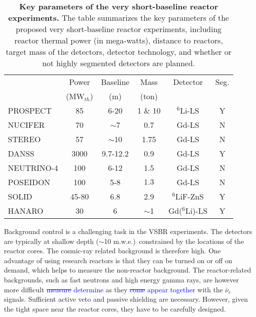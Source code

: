 \documentclass[aps,twocolumn,preprintnumbers,amsmath,superscriptaddress,amssymb,floats,nofootinbib]{revtex4-1}
\begin{document}
\begin{table}[tb]
  \begin{tabular}{lccccc}
  \hline
  & Power & Baseline & Mass & Detector & Seg. \\
  & (MW$_{th}$) & (m) & (ton) &    & \\
  \hline
  PROSPECT  & 85  & 6-20 & 1 \& 10  & $^6$Li-LS & Y \\
  NUCIFER   & 70 & $\sim$7  & 0.7 & Gd-LS & N \\
  STEREO & 57  & $\sim$10 & 1.75  & Gd-LS & N \\
  DANSS & 3000  & 9.7-12.2  & 0.9  & Gd-LS & Y \\
  NEUTRINO-4 & 100  & 6-12  & 1.5  & Gd-LS & N \\
  POSEIDON & 100  & 5-8  & $1.3$ & Gd-LS & N \\
  SOLID & 45-80 & 6.8  & 2.9  & $^6$LiF-ZnS & Y \\
  HANARO & 30  & 6  & $\sim$1  & Gd($^6$Li)-LS & Y \\
  \hline
  \end{tabular}
  \caption{{\bf Key parameters of the very short-baseline reactor experiments.} The table summarizes the key parameters of the proposed very short-baseline reactor experiments, including reactor thermal power (in mega-watts), distance to reactors, target mass of the detectors, detector technology, and whether or not highly segmented detectors are planned.}
\label{tab:sterile}
\end{table}

Background control is a challenging task in the VSBR experiments. 
The detectors are typically at shallow depth ($\sim$10 m.w.e.)\ constrained by the locations of the reactor cores. 
The cosmic-ray related background is therefore high. 
One advantage of using research reactors is that they can be turned on or off on demand, which helps to measure the non-reactor background. 
The reactor-related backgrounds, such as fast neutrons and high energy gamma rays, are however more difficult \textcolor{blue}{\st{measure} determine} 
as they \textcolor{blue}{\st{come} appear  together} with the $\bar\nu_e$ signals. 
Sufficient active veto and passive shielding are necessary. However, given the tight space near the reactor cores,  they have to be carefully designed.
\end{document}
